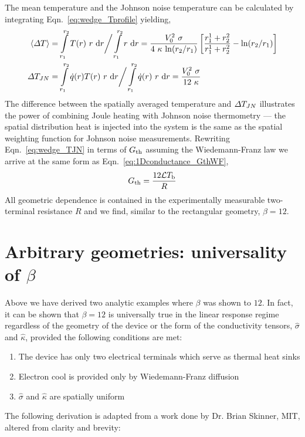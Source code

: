 The mean temperature and the Johnson noise temperature can be calculated by integrating Eqn.~\ref{eq:wedge_Tprofile} yielding,
\begin{align}
\langle\Delta T\rangle &= \int\limits_{r_1}^{r_2}T(r)~r~\mathrm{d}r \bigg/ \int\limits_{r_1}^{r_2}r~\mathrm{d}r =\frac{V_0^2~\sigma}{4~\kappa~\mathrm{ln}(r_2/r_1)}\left[\frac{r_1^1+r_2^2}{r_1^1+r_2^2}-\mathrm{ln}(r_2/r_1)\right] \\
\Delta T_{JN} &= \int\limits_{r_1}^{r_2}\dot{q}(r)T(r)~r~\mathrm{d}r \bigg/ \int\limits_{r_1}^{r_2}\dot{q}(r)~r~\mathrm{d}r = \frac{V_0^2~\sigma}{12~\kappa}\label{eq:wedge_TJN}
\end{align}
The difference between the spatially averaged temperature and $\Delta T_{JN}$ illustrates the power of combining Joule heating with Johnson noise thermometry --- the spatial distribution heat is injected into the system is the same as the spatial weighting function for Johnson noise measurements. Rewriting Eqn.~\ref{eq:wedge_TJN} in terms of $G_{\mathrm{th}}$ assuming the Wiedemann-Franz law we arrive at the same form as Eqn.~\ref{eq:1Dconductance_GthWF},
\begin{equation}\label{eq:wedge_GthWF}
G_{\mathrm{th}} = \frac{12\mathcal{L} T_\mathrm{b}}{R}
\end{equation}
All geometric dependence is contained in the experimentally measurable two-terminal resistance $R$ and we find, similar to the rectangular geometry, $\beta = 12$.

\section{Arbitrary geometries: universality of $\beta$}
\label{section:beta}
Above we have derived two analytic examples where $\beta$ was shown to $12$. In fact, it can be shown that $\beta = 12$ is universally true in the linear response regime regardless of the geometry of the device or the form of the conductivity tensors, $\hat\sigma$ and $\hat\kappa$, provided the following conditions are met:
\begin{enumerate}
\item The device has only two electrical terminals which serve as thermal heat sinks
\item Electron cool is provided only by Wiedemann-Franz diffusion
\item $\hat\sigma$ and $\hat\kappa$ are spatially uniform
\end{enumerate}
The following derivation is adapted from a work done by Dr. Brian Skinner, MIT, altered from clarity and brevity:

